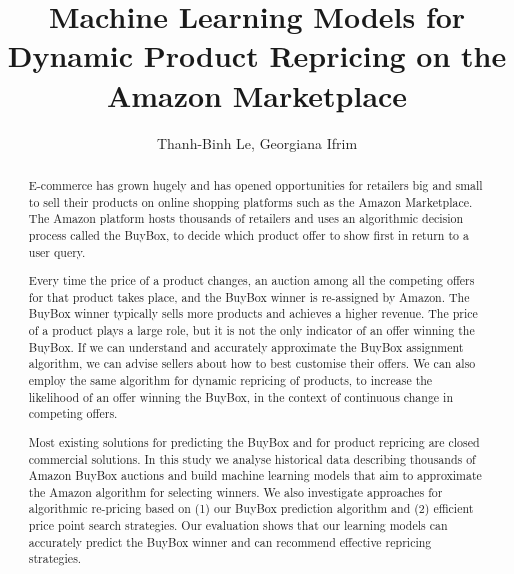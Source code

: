 \documentclass[]{acmart}
\begin{document}
\title{Machine Learning Models for Dynamic Product Repricing on the Amazon Marketplace}


\author{Thanh-Binh Le, Georgiana Ifrim}



\begin{abstract}	
	
	E-commerce has grown hugely and has opened opportunities for retailers big and small to sell their products on online shopping platforms such as the Amazon Marketplace. The Amazon platform hosts thousands of retailers and uses an algorithmic decision process called the BuyBox, to decide which product offer to show first in return to a user query.

	Every time the price of a product changes, an auction among all the competing offers for that product takes place, and the BuyBox winner is re-assigned by Amazon. The BuyBox winner typically sells more products and achieves a higher revenue. The price of a product plays a large role, but it is not the only indicator of an offer winning the BuyBox. If we can understand and accurately approximate the BuyBox assignment algorithm, we can advise sellers about how to best customise their offers. We can also employ the same algorithm for dynamic repricing of products, to increase the likelihood of an offer winning the BuyBox, in the context of continuous change in competing offers.
	
	Most existing solutions for predicting the BuyBox and for product repricing are closed commercial solutions. In this study we analyse historical data describing thousands of Amazon BuyBox auctions  and build machine learning models that aim to approximate the Amazon algorithm for selecting winners. We also investigate approaches for algorithmic re-pricing based on (1) our BuyBox prediction algorithm and (2) efficient price point search strategies. Our evaluation shows that our learning models can accurately predict the BuyBox winner and can recommend effective repricing strategies.
 
	
\end{abstract}

\maketitle





% 


%



% 

\end{document}
